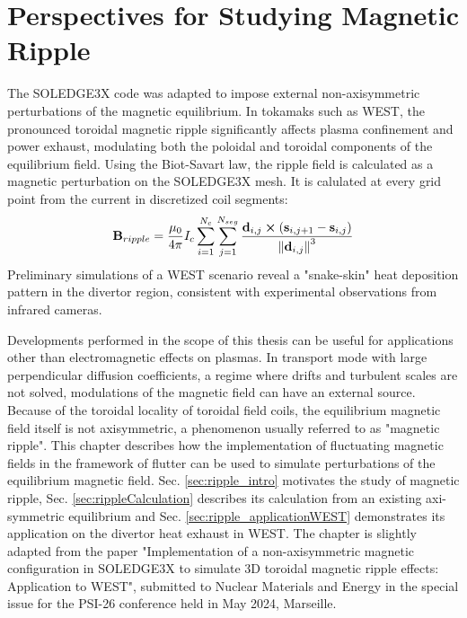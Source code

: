 \chapter{Perspectives for Studying Magnetic Ripple}
\label{chap:RippleMagnetic}


\begin{chaptersummarybox}
	The SOLEDGE3X code was adapted to impose external non-axisymmetric perturbations of the magnetic equilibrium. In tokamaks such as WEST, the pronounced toroidal magnetic ripple significantly affects plasma confinement and power exhaust, modulating both the poloidal and toroidal components of the equilibrium field. Using the Biot-Savart law, the ripple field is calculated as a magnetic perturbation on the SOLEDGE3X mesh. It is calulated at every grid point from the current in discretized coil segments:
	\begin{equation*}
		\textbf{B}_{ripple} = \frac{\mu_0}{4\pi}I_c\sum_{i=1}^{N_{c}}\sum_{j=1}^{N_{seg}}\frac{\textbf{d}_{i,j}\cross\left(\textbf{s}_{i,j+1} - \textbf{s}_{i,j}\right)}{\norm{\textbf{d}_{i,j}}^3}
	\end{equation*}	
	Preliminary simulations of a WEST scenario reveal a "snake-skin" heat deposition pattern in the divertor region, consistent with experimental observations from infrared cameras.
\end{chaptersummarybox}

\newpage


Developments performed in the scope of this thesis can be useful for applications other than electromagnetic effects on plasmas. In transport mode with large perpendicular diffusion coefficients, a regime where drifts and turbulent scales are not solved, modulations of the magnetic field can have an external source. Because of the toroidal locality of toroidal field coils, the equilibrium magnetic field itself is not axisymmetric, a phenomenon usually referred to as "magnetic ripple". This chapter describes how the implementation of fluctuating magnetic fields in the framework of flutter can be used to simulate perturbations of the equilibrium magnetic field. Sec. \ref{sec:ripple_intro} motivates the study of magnetic ripple, Sec. \ref{sec:rippleCalculation} describes its calculation from an existing axi-symmetric equilibrium and Sec. \ref{sec:ripple_applicationWEST} demonstrates its application on the divertor heat exhaust in WEST. The chapter is slightly adapted from the paper "Implementation of a non-axisymmetric magnetic configuration in SOLEDGE3X to simulate 3D toroidal magnetic ripple effects: Application to WEST", submitted to Nuclear Materials and Energy in the special issue for the PSI-26 conference held in May 2024, Marseille.


